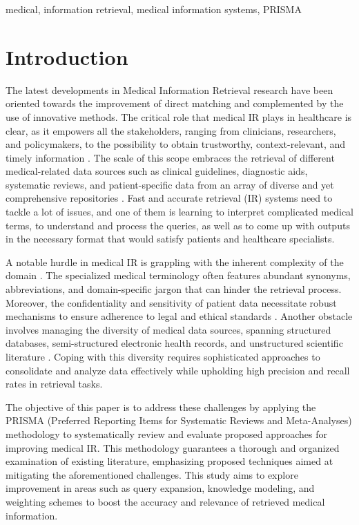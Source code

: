 \documentclass[conference]{IEEEtran}
\begin{document}
\begin{IEEEkeywords}
    medical, information retrieval, medical information systems, PRISMA
\end{IEEEkeywords}

\section{Introduction}

The latest developments in Medical Information Retrieval research have been oriented towards the improvement of direct matching and complemented by the use of innovative methods. The critical role that medical IR plays in healthcare is clear, as it empowers all the stakeholders, ranging from clinicians, researchers, and policymakers, to the possibility to obtain trustworthy, context-relevant, and timely information \cite{McGowan2009}. The scale of this scope embraces the retrieval of different medical-related data sources such as clinical guidelines, diagnostic aids, systematic reviews, and patient-specific data from an array of diverse and yet comprehensive repositories \cite{Cadag2010}. Fast and accurate retrieval (IR) systems need to tackle a lot of issues, and one of them is learning to interpret complicated medical terms, to understand and process the queries, as well as to come up with outputs in the necessary format that would satisfy patients and healthcare specialists.

A notable hurdle in medical IR is grappling with the inherent complexity of the domain \cite{Goeuriot2014}. The specialized medical terminology often features abundant synonyms, abbreviations, and domain-specific jargon that can hinder the retrieval process. Moreover, the confidentiality and sensitivity of patient data necessitate robust mechanisms to ensure adherence to legal and ethical standards \cite{McCarthy2008}. Another obstacle involves managing the diversity of medical data sources, spanning structured databases, semi-structured electronic health records, and unstructured scientific literature \cite{Quamar2020}. Coping with this diversity requires sophisticated approaches to consolidate and analyze data effectively while upholding high precision and recall rates in retrieval tasks.

The objective of this paper is to address these challenges by applying the PRISMA (Preferred Reporting Items for Systematic Reviews and Meta-Analyses) methodology to systematically review and evaluate proposed approaches for improving medical IR. This methodology guarantees a thorough and organized examination of existing literature, emphasizing proposed techniques aimed at mitigating the aforementioned challenges. This study aims to explore improvement in areas such as query expansion, knowledge modeling, and weighting schemes to boost the accuracy and relevance of retrieved medical information.
\end{document}
